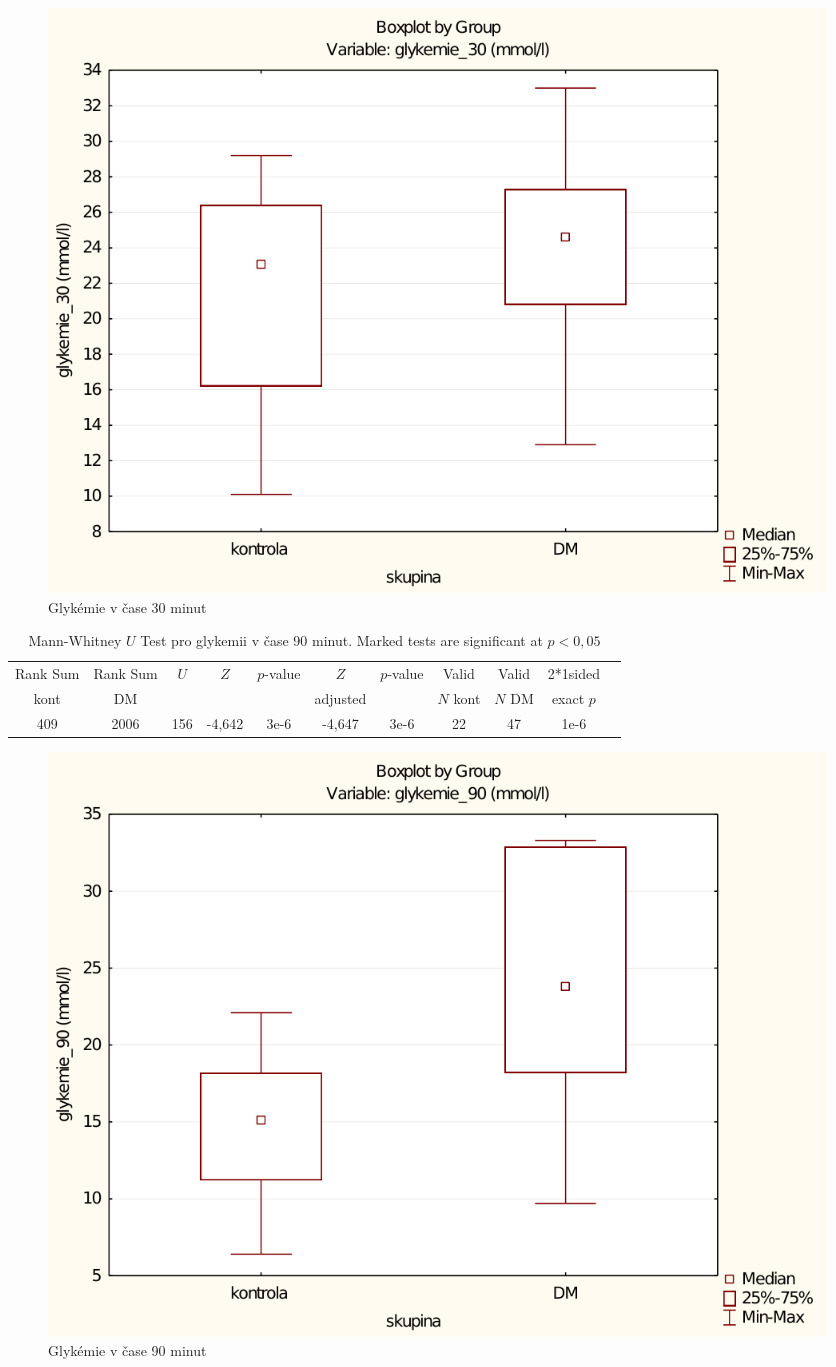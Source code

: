 \documentclass[12pt]{article}
\begin{document}
\begin{figure}
	\begin{centering}
	\includegraphics[width=0.75\linewidth]{glykemie30-box.pdf}
	\caption{Glykémie v čase 30 minut}
	\end{centering}
\end{figure}

\begin{table}
\begin{tabular}{|c|c|c|c|c|c|c|c|c|c|c|}
\hline
Rank Sum & Rank Sum & $U$ & $Z$ & $p$-value & $Z$ & $p$-value & Valid & Valid & 2*1sided \\
kont & DM & & & & adjusted & & $N$ kont & $N$ DM & exact $p$ \\
\hline
409 & 2006 & 156 & -4,642 & 3e-6 & -4,647 & 3e-6 & 22 & 47 & 1e-6 \\
\hline
\end{tabular}
\caption{Mann-Whitney $U$ Test pro glykemii v čase 90 minut. Marked tests are significant at $p < 0,05$}
\end{table}

\begin{figure}
	\begin{centering}
	\includegraphics[width=0.75\linewidth]{glykemie90-box.pdf}
	\caption{Glykémie v čase 90 minut}
	\end{centering}
\end{figure}
\end{document}
